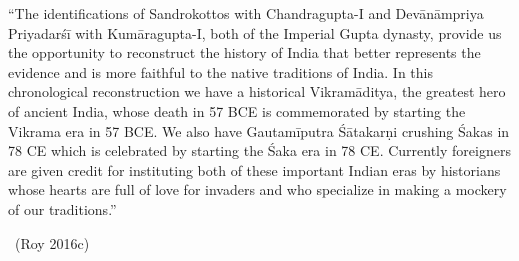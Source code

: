 \begin{myquote}
“The identifications of Sandrokottos with Chandragupta-I and Devānāmpriya Priyadarśī with Kumāragupta-I, both of the Imperial Gupta dynasty, provide us the opportunity to reconstruct the history of India that better represents the evidence and is more faithful to the native traditions of India. In this chronological reconstruction we have a historical Vikramā\-ditya, the greatest hero of ancient India, whose death in 57 BCE is commemorated by starting the Vikrama era in 57 BCE. We also have Gautamīputra Śātakarṇi crushing Śakas in 78 CE which is celebrated by starting the Śaka era in 78 CE. Currently foreigners are given credit for instituting both of these important Indian eras by historians whose hearts are full of love for invaders and who specialize in making a mockery of our traditions.” 

~\hfill (Roy 2016c)
\end{myquote}

